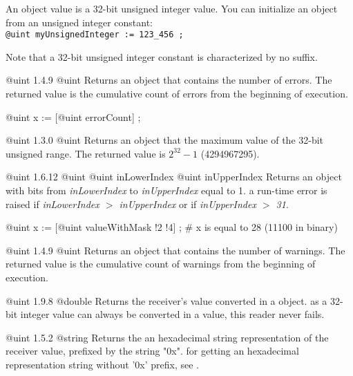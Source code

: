 

An  object value is a 32-bit unsigned integer value. You can initialize an  object from an unsigned integer constant:\\

\texttt{@uint myUnsignedInteger := 123\_456 ;}

Note that a 32-bit unsigned integer constant is characterized by no suffix.


{@uint}
{1.4.9}
{@uint}
{Returns an  object that contains the number of errors.}
{The returned value is the cumulative count of errors from the beginning of execution.}

\exempleUneLigne
{}
{@uint x := [@uint errorCount] ;}

{@uint}
{1.3.0}
{@uint}
{Returns an  object that the maximum value of the 32-bit unsigned range.}
{The returned value is $2^{32}-1$ (4294967295).}


{@uint}
{1.6.12}
{@uint}
{@uint inLowerIndex}
{@uint inUpperIndex}
{Returns an  object with bits from \emph{inLowerIndex} to \emph{inUpperIndex} equal to 1.}
{a run-time error is raised if \emph{inLowerIndex $>$ inUpperIndex} or if \emph{inUpperIndex $>$ 31}.}


\exempleUneLigne
{}
{@uint x := [@uint valueWithMask !2 !4] ; \# x is equal to 28 (11100 in binary)}





{@uint}
{1.4.9}
{@uint}
{Returns an  object that contains the number of warnings.}
{The returned value is the cumulative count of warnings from the beginning of execution.}



{@uint}
{1.9.8}
{@double}
{Returns the receiver's value converted in a  object.}
{as a 32-bit integer value can always be converted in a  value, this reader never fails.}



{@uint}
{1.5.2}
{@string}
{Returns the an hexadecimal string representation of the receiver value, prefixed by the string "0x".}
{for getting an hexadecimal representation string without '0x' prefix, see .}



